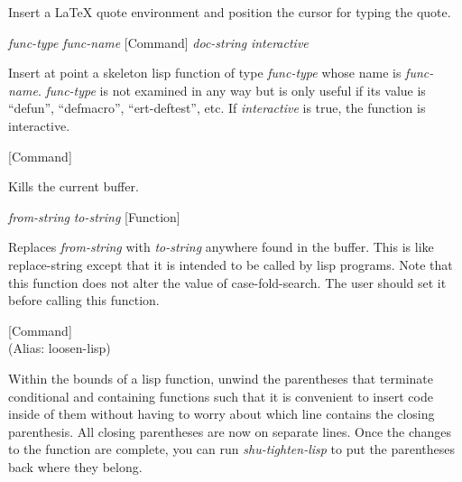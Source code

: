 \begin{doc-string}
Insert a LaTeX quote environment and position the cursor for typing the quote.
\end{doc-string}

\vspace{1em}
\noindent
{}
\usebox{\funcname}\emph{func-type} \emph{func-name}
 \hfill [Command]
\hspace*{\wd\funcname}\emph{doc-string} \emph{interactive}

\begin{doc-string}
Insert at point a skeleton lisp function of type \emph{func-type} whose name is
\emph{func-name}.  \emph{func-type} is not examined in any way but is only useful if its
value is ``defun'', ``defmacro'', ``ert-deftest'', etc.  If \emph{interactive} is
true, the function is interactive.
\end{doc-string}

\vspace{1em}
\noindent
{}
\usebox{\funcname}
 \hfill [Command]

\begin{doc-string}
Kills the current buffer.
\end{doc-string}

\vspace{1em}
\noindent
{}
\usebox{\funcname}\emph{from-string} \emph{to-string}
 \hfill [Function]

\begin{doc-string}
Replaces \emph{from-string} with \emph{to-string} anywhere found in the buffer.
This is like replace-string except that it is intended to be called
by lisp programs.  Note that this function does not alter the value of
case-fold-search.  The user should set it before calling this function.
\end{doc-string}

\vspace{1em}
\noindent
{}
\usebox{\funcname}
 \hfill [Command]\\%
 (Alias: loosen-lisp)

\begin{doc-string}
Within the bounds of a lisp function, unwind the parentheses that terminate
conditional and containing functions such that it is convenient to insert code
inside of them without having to worry about which line contains the closing
parenthesis.  All closing parentheses are now on separate lines.  Once the
changes to the function are complete, you can run \emph{shu-tighten-lisp} to put the
parentheses back where they belong.
\end{doc-string}

